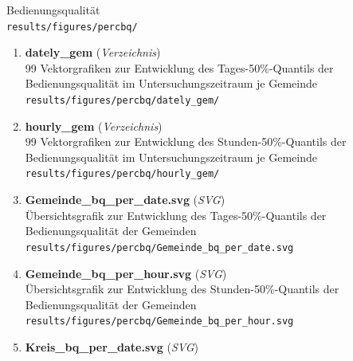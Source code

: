 \begin{enumerate}[label=A\arabic*, ref=A\arabic*, leftmargin=*, itemsep=0.5em, topsep=0.3em]
\begin{enumerate}[label=A\arabic{enumi}-\arabic*, ref=A\arabic{enumi}-\arabic*, leftmargin=*, itemsep=0.5em, topsep=0.3em]
\begin{enumerate}[label=A\arabic{enumi}-\arabic{enumii}-\arabic*, ref=A\arabic{enumi}-\arabic{enumii}-\arabic*, leftmargin=*, itemsep=0.5em, topsep=0.3em]
Bedienungsqualität\\
\texttt{\small results/figures/percbq/}
\edef\appendixlabelkey{app:A\arabic{enumi}-\arabic{enumii}-\arabic{enumiii}}
\expandafter\label\expandafter{\appendixlabelkey}
\begin{enumerate}[label=A\arabic{enumi}-\arabic{enumii}-\arabic{enumiii}-\arabic*, ref=A\arabic{enumi}-\arabic{enumii}-\arabic{enumiii}-\arabic*, leftmargin=*, itemsep=0.5em, topsep=0.3em]
\item \textbf{dately\_gem} \textnormal{(\textit{Verzeichnis})}\\
99 Vektorgrafiken zur Entwicklung des Tages-50\%-Quantils der Bedienungsqualität im Untersuchungszeitraum je Gemeinde\\
\texttt{\small results/figures/percbq/dately\_gem/}
\edef\appendixlabelkey{app:A\arabic{enumi}-\arabic{enumii}-\arabic{enumiii}-\arabic{enumiv}}
\expandafter\label\expandafter{\appendixlabelkey}
\item \textbf{hourly\_gem} \textnormal{(\textit{Verzeichnis})}\\
99 Vektorgrafiken zur Entwicklung des Stunden-50\%-Quantils der Bedienungsqualität im Untersuchungszeitraum je Gemeinde\\
\texttt{\small results/figures/percbq/hourly\_gem/}
\edef\appendixlabelkey{app:A\arabic{enumi}-\arabic{enumii}-\arabic{enumiii}-\arabic{enumiv}}
\expandafter\label\expandafter{\appendixlabelkey}
\item \textbf{Gemeinde\_bq\_per\_date.svg} \textnormal{(\textit{SVG})}\\
Übersichtsgrafik zur Entwicklung des Tages-50\%-Quantils der Bedienungsqualität der Gemeinden\\
\texttt{\small results/figures/percbq/Gemeinde\_bq\_per\_date.svg}
\edef\appendixlabelkey{app:A\arabic{enumi}-\arabic{enumii}-\arabic{enumiii}-\arabic{enumiv}}
\expandafter\label\expandafter{\appendixlabelkey}
\item \textbf{Gemeinde\_bq\_per\_hour.svg} \textnormal{(\textit{SVG})}\\
Übersichtsgrafik zur Entwicklung des Stunden-50\%-Quantils der Bedienungsqualität der Gemeinden\\
\texttt{\small results/figures/percbq/Gemeinde\_bq\_per\_hour.svg}
\edef\appendixlabelkey{app:A\arabic{enumi}-\arabic{enumii}-\arabic{enumiii}-\arabic{enumiv}}
\expandafter\label\expandafter{\appendixlabelkey}
\item \textbf{Kreis\_bq\_per\_date.svg} \textnormal{(\textit{SVG})}\\

\end{enumerate}
\end{enumerate}
\end{enumerate}
\end{enumerate}

